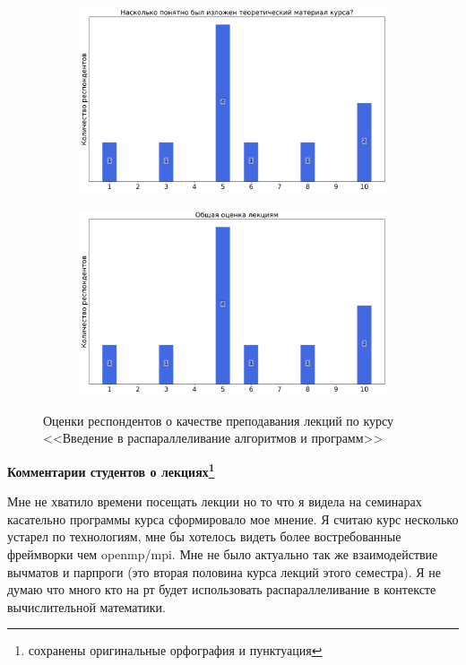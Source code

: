 \begin{figure}[H]
\begin{subfigure}[b]{0.45\textwidth}
			\end{subfigure}
			\begin{subfigure}[b]{0.45\textwidth}
				\centering
				\includegraphics[width=\textwidth]{images/4 course/Введение в распараллеливание алгоритмов и программ/lecturer-marks-Карпов В.Е.-2.png}
			\end{subfigure}	
			\begin{subfigure}[b]{0.45\textwidth}
				\centering
				\includegraphics[width=\textwidth]{images/4 course/Введение в распараллеливание алгоритмов и программ/lecturer-marks-Карпов В.Е.-3.png}
			\end{subfigure}
			\caption{Оценки респондентов о качестве преподавания лекций по курсу <<Введение в распараллеливание алгоритмов и программ>>}
		\end{figure}

		\textbf{Комментарии студентов о лекциях\protect\footnote{сохранены оригинальные орфография и пунктуация}}
            \begin{commentbox} 
                Мне не хватило времени посещать лекции но то что я видела на семинарах касательно программы курса сформировало мое мнение. Я считаю курс несколько устарел по технологиям, мне бы хотелось видеть более востребованные фреймворки чем openmp/mpi. Мне не было актуально так же взаимодействие вычматов и парпроги (это вторая половина курса лекций этого семестра). Я не думаю что много кто на рт будет использовать распараллеливание в контексте вычислительной математики. 
            \end{commentbox} 
        

